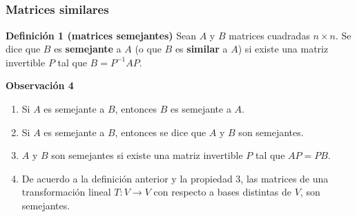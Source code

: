 %
%
%


\subsection{}
%
\begin{frame}\frametitle{Matrices similares}
	
	\begin{block}{\textbf{Definición 1 (matrices semejantes)}}
		\justifying
		Sean $A$ y $B$ matrices cuadradas $n\times n$. Se dice que $B$ es \textbf{semejante } a $A$ (o que $B$ es \textbf{similar} a $A$) si existe una matriz invertible $P$ tal que $B=P^{-1}AP$.
	\end{block}
	
	\begin{alertblock}{\textbf{Observación 4 }}		
		\begin{enumerate}[$a$]\justifying
			\item Si $A$ es semejante a $B$, entonces  $B$ es semejante a $A$. 
			\item Si $A$ es semejante a $B$,  entonces se dice que $A$ y $B$ son semejantes. 
			\item $A$ y $B$ son semejantes si existe una matriz invertible $P$ tal que $AP=PB$.
			\item De acuerdo a la definición anterior y la propiedad 3, las matrices de una transformación lineal $T:V\longrightarrow V$ con respecto a bases distintas de $V$, son semejantes.
		\end{enumerate}		
	\end{alertblock}
	

\end{frame}


